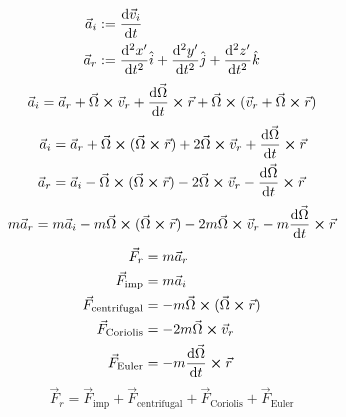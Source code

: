 \documentclass{article}
\begin{document}
\begin{align*}
	\vec{a}_i &:= \dv{\vec{v}_i}{t} \\
	\vec{a}_r &:= \dv[2]{x'}{t} \hat{i} + \dv[2]{y'}{t} \hat{j} + \dv[2]{z'}{t} \hat{k}
\end{align*}
\[ \vec{a}_i = \vec{a}_r + \vec{\Omega} \cross \vec{v}_r + \dv{\vec{\Omega}}{t} \cross \vec{r} + \vec{\Omega} \cross (\vec{v}_r +\vec{\Omega} \cross \vec{r}) \]
\begin{align*}
	\vec{a}_i &= \vec{a}_r + \vec{\Omega} \cross (\vec{\Omega} \cross \vec{r}) + 2 \vec{\Omega} \cross \vec{v}_r + \dv{\vec{\Omega}}{t} \cross \vec{r} \\
	\vec{a}_r &= \vec{a}_i - \vec{\Omega} \cross (\vec{\Omega} \cross \vec{r}) - 2 \vec{\Omega} \cross \vec{v}_r - \dv{\vec{\Omega}}{t} \cross \vec{r}
\end{align*}
\[ m \vec{a}_r = m \vec{a}_i - m \vec{\Omega} \cross (\vec{\Omega} \cross \vec{r}) - 2 m \vec{\Omega} \cross \vec{v}_r - m \dv{\vec{\Omega}}{t} \cross \vec{r} \]
\begin{align*}
	\vec{F}_r &= m \vec{a}_r \\
	\vec{F}_{\text{imp}} &= m \vec{a}_i \\
	\vec{F}_{\text{centrifugal}} &= - m \vec{\Omega} \cross (\vec{\Omega}
	\cross \vec{r}) \\
	\vec{F}_{\text{Coriolis}} &= - 2 m \vec{\Omega} \cross \vec{v}_r \\
	\vec{F}_{\text{Euler}} &= - m \dv{\vec{\Omega}}{t} \cross \vec{r}
\end{align*}
\[\vec{F}_r = \vec{F}_{\text{imp}} + \vec{F}_{\text{centrifugal}} + \vec{F}_{\text{Coriolis}} + \vec{F}_{\text{Euler}} \]
\end{document}
